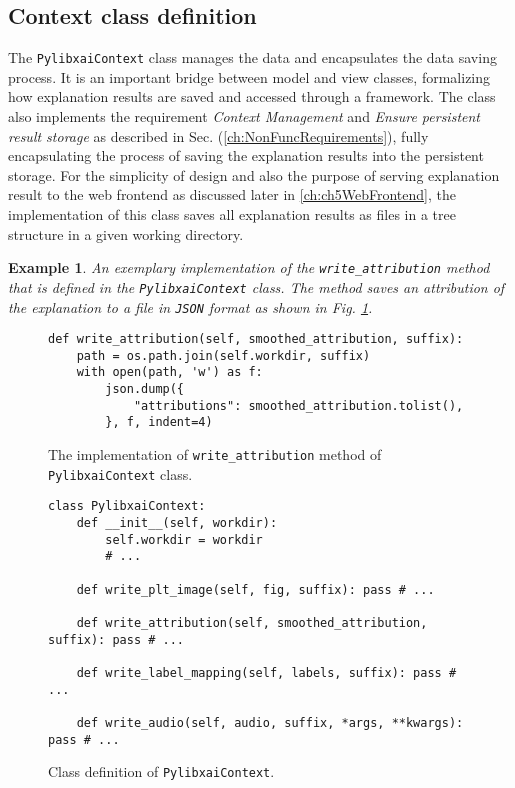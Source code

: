\documentclass[
    bindingoffset=5mm,  %
    footnoteindent=3mm, %
    hyphenation=true    %
]{src/wut-thesis}
\newtheorem{example}{Example}
\begin{document}
\subsection{Context class definition}

The \texttt{PylibxaiContext} class manages the data and encapsulates the data saving process.
It is an important bridge between model and view classes, formalizing how explanation results
are saved and accessed through a framework.
The class also implements the requirement \textit{Context Management}
and \textit{Ensure persistent result storage} as described
in Sec. (\ref{ch:NonFuncRequirements}), fully encapsulating the process of
saving the explanation results into the persistent storage. For the simplicity of design and also the purpose of serving
explanation result to the web frontend as discussed later in \ref{ch:ch5WebFrontend},
the implementation of this class saves all explanation results as files in a tree structure in a given working directory.

\begin{example}
    An exemplary implementation of the \texttt{write\_attribution} method that is defined in the
    \texttt{PylibxaiContext} class. The method saves an attribution of the explanation to a file in \texttt{JSON} format
    as shown in Fig. \ref{fig:WriteAttributionMethod}.
\end{example}

\begin{figure}%
\begin{verbatim}
def write_attribution(self, smoothed_attribution, suffix):
    path = os.path.join(self.workdir, suffix)
    with open(path, 'w') as f:
        json.dump({
            "attributions": smoothed_attribution.tolist(),
        }, f, indent=4)
\end{verbatim}
\caption{The implementation of \texttt{write\_attribution} method of \texttt{PylibxaiContext} class.}
\label{fig:WriteAttributionMethod}
\end{figure}

\begin{figure}%
\begin{verbatim}
class PylibxaiContext:
    def __init__(self, workdir):
        self.workdir = workdir
        # ...
    
    def write_plt_image(self, fig, suffix): pass # ...
    
    def write_attribution(self, smoothed_attribution, suffix): pass # ...

    def write_label_mapping(self, labels, suffix): pass # ...
    
    def write_audio(self, audio, suffix, *args, **kwargs): pass # ...
\end{verbatim}
\caption{Class definition of \texttt{PylibxaiContext}.}
\label{fig:PylibxaiContext}
\end{figure}
\end{document}

